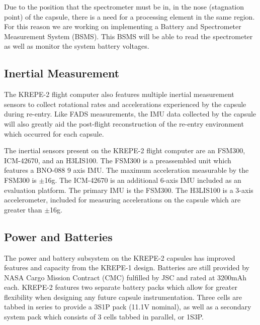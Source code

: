 \documentclass{article}
\begin{document}
Due to the position that the spectrometer must be in, in the nose (stagnation point) of the capsule, there is a need for a processing element in the same region. For this reason we are working on implementing a Battery and Spectrometer Measurement System (BSMS). This BSMS will be able to read the spectrometer as well as monitor the system battery voltages. 

\subsection{Inertial Measurement}
The KREPE-2 flight computer also features multiple inertial measurement sensors to collect rotational rates and accelerations experienced by the capsule during re-entry. Like FADS measurements, the IMU data collected by the capsule will also greatly aid the post-flight reconstruction of the re-entry environment which occurred for each capsule.

The inertial sensors present on the KREPE-2 flight computer are an FSM300, ICM-42670, and an H3LIS100. The FSM300 is a preassembled unit which features a BNO-088 9 axis IMU. The maximum acceleration measurable by the FSM300 is $\pm$16g. The ICM-42670 is an additional 6-axis IMU included as an evaluation platform. The primary IMU is the FSM300. The H3LIS100 is a 3-axis accelerometer, included for measuring accelerations on the capsule which are greater than $\pm$16g.




\subsection{Power and Batteries}

The power and battery subsystem on the KREPE-2 capsules has improved features and capacity from the KREPE-1 design. Batteries are still provided by NASA Cargo Mission Contract (CMC) fulfilled by JSC and rated at 3200mAh each. KREPE-2 features two separate battery packs which allow for greater flexibility when designing any future capsule instrumentation. Three cells are tabbed in series to provide a 3S1P pack (11.1V nominal), as well as a secondary system pack which consists of 3 cells tabbed in parallel, or 1S3P. %
\end{document}
